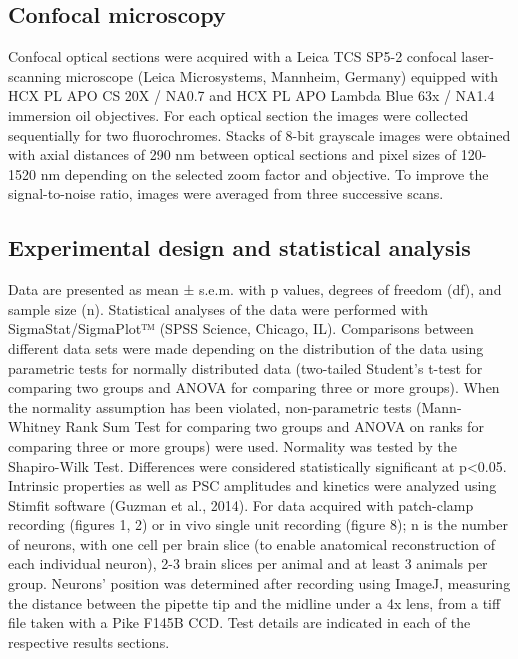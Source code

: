 \documentclass{article}
\begin{document}
\subsection{Confocal microscopy}
Confocal optical sections were acquired with a Leica TCS SP5-2 confocal laser-scanning microscope (Leica Microsystems, Mannheim, Germany) equipped with HCX PL APO CS 20X / NA0.7 and HCX PL APO Lambda Blue 63x / NA1.4 immersion oil objectives. For each optical section the images were collected sequentially for two fluorochromes. Stacks of 8-bit grayscale images were obtained with axial distances of 290 nm between optical sections and pixel sizes of 120-1520 nm depending on the selected zoom factor and objective. To improve the signal-to-noise ratio, images were averaged from three successive scans. 
\subsection{Experimental design and statistical analysis}
Data are presented as mean ± s.e.m. with p values, degrees of freedom (df), and sample size (n). Statistical analyses of the data were performed with SigmaStat/SigmaPlot™ (SPSS Science, Chicago, IL). Comparisons between different data sets were made depending on the distribution of the data using parametric tests for normally distributed data (two-tailed Student’s t-test for comparing two groups and ANOVA for comparing three or more groups). When the normality assumption has been violated, non-parametric tests (Mann-Whitney Rank Sum Test for comparing two groups and ANOVA on ranks for comparing three or more groups) were used. Normality was tested by the Shapiro-Wilk Test. Differences were considered statistically significant at p<0.05. Intrinsic properties as well as PSC amplitudes and kinetics were analyzed using Stimfit software (Guzman et al., 2014). For data acquired with patch-clamp recording (figures 1, 2) or in vivo single unit recording (figure 8); n is the number of neurons, with one cell per brain slice (to enable anatomical reconstruction of each individual neuron), 2-3 brain slices per animal and at least 3 animals per group. Neurons’ position was determined after recording using ImageJ, measuring the distance between the pipette tip and the midline under a 4x lens, from a tiff file taken with a Pike F145B CCD. Test details are indicated in each of the respective results sections.
\end{document}
